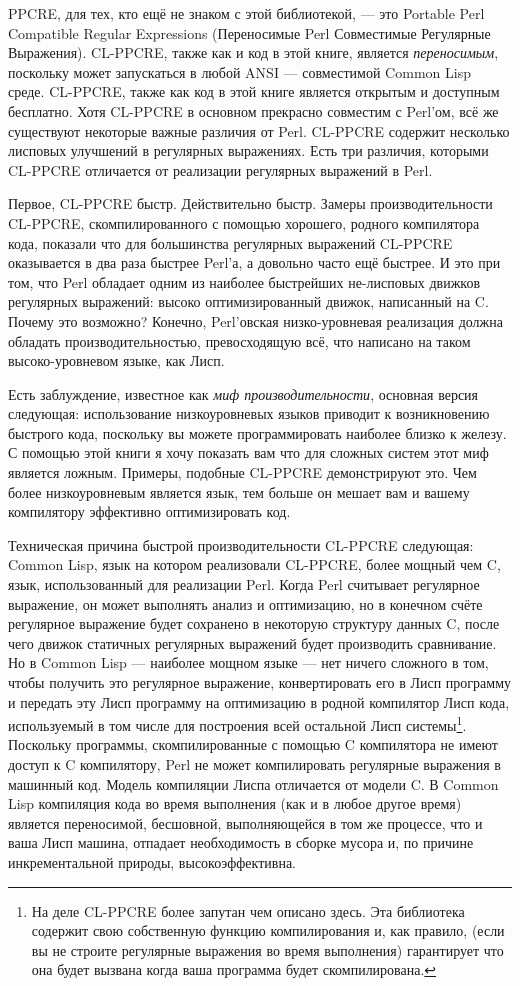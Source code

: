 PPCRE, для тех, кто ещё не знаком с этой библиотекой, --- это Portable Perl Compatible Regular Expressions (Переносимые Perl Совместимые Регулярные Выражения). CL-PPCRE, также как и код в этой книге, является \emph{переносимым}, поскольку может запускаться в любой ANSI --- совместимой Common Lisp среде. CL-PPCRE, также как код в этой книге является открытым и доступным бесплатно. Хотя CL-PPCRE в основном прекрасно совместим с Perl'ом, всё же существуют некоторые важные различия от Perl. CL-PPCRE содержит несколько лисповых улучшений в регулярных выражениях. Есть три различия, которыми CL-PPCRE отличается от реализации регулярных выражений в Perl.

Первое, CL-PPCRE быстр. Действительно быстр. Замеры производительности CL-PPCRE, скомпилированного с помощью хорошего, родного компилятора кода, показали что для большинства регулярных выражений CL-PPCRE оказывается в два раза быстрее Perl'а, а довольно часто ещё быстрее. И это при том, что Perl обладает одним из наиболее быстрейших не-лисповых движков регулярных выражений: высоко оптимизированный движок, написанный на C. Почему это возможно? Конечно, Perl'овская низко-уровневая реализация должна обладать производительностью, превосходящую всё, что написано на таком высоко-уровневом языке, как Лисп.

Есть заблуждение, известное как \emph{миф производительности}, основная версия следующая: использование низкоуровневых языков приводит к возникновению быстрого кода, поскольку вы можете программировать наиболее близко к железу. С помощью этой книги я хочу показать вам что для сложных систем этот миф является ложным. Примеры, подобные CL-PPCRE демонстрируют это. Чем более низкоуровневым является язык, тем больше он мешает вам и вашему компилятору эффективно оптимизировать код.

Техническая причина быстрой производительности CL-PPCRE следующая: Common Lisp, язык на котором реализовали CL-PPCRE, более мощный чем C, язык, использованный для реализации Perl. Когда Perl считывает регулярное выражение, он может выполнять анализ и оптимизацию, но в конечном счёте регулярное выражение будет сохранено в некоторую структуру данных C, после чего движок статичных регулярных выражений будет производить сравнивание. Но в Common Lisp --- наиболее мощном языке --- нет ничего сложного в том, чтобы получить это регулярное выражение, конвертировать его в Лисп программу и передать эту Лисп программу на оптимизацию в родной компилятор Лисп кода, используемый в том числе для построения всей остальной Лисп системы\footnote{На деле CL-PPCRE более запутан чем описано здесь. Эта библиотека содержит свою собственную функцию компилирования и, как правило, (если вы не строите регулярные выражения во время выполнения) гарантирует что она будет вызвана когда ваша программа будет скомпилирована.}. Поскольку программы, скомпилированные с помощью C компилятора не имеют доступ к C компилятору, Perl не может компилировать регулярные выражения в машинный код. Модель компиляции Лиспа отличается от модели C. В Common Lisp компиляция кода во время выполнения (как и в любое другое время) является переносимой, бесшовной, выполняющейся в том же процессе, что и ваша Лисп машина, отпадает необходимость в сборке мусора и, по причине инкрементальной природы, высокоэффективна.

